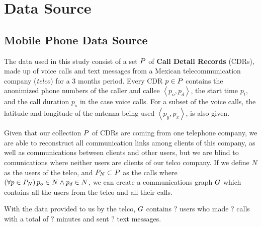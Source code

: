 \section{Data Source}

\subsection{Mobile Phone Data Source}

The data used in this study consist of a set \( \mathlarger{P} \) of \textbf{Call Detail Records} (CDRs), made up of voice calls and text messages from a Mexican telecommunication company (\textit{telco}) for a 3 months period.
Every CDR \( p \in \mathlarger{P} \)  contains the anonimized phone numbers of the caller and callee \( \left< p_o, p_d \right> \), the start time \( p_t \), and the call duration \( p_s \) in the case voice calls. 
For a subset of the voice calls, the latitude and longitude of the antenna being used \( \left< p_y, p_x \right> \), is also given.


Given that our collection \( \mathlarger{P} \) of CDRs are
coming from one telephone company, 
we are able to reconstruct all communication links among clients of this company, as well as communications between clients and other users, but we are blind to comunications where neither users are clients of our telco company.
If we define \( N \) as the users of the telco, and \( \mathlarger{P}_N \subset \mathlarger{P} \) as the calls where \( \left( \forall p \in \mathlarger{P}_N \right) p_o \in N \wedge p_d \in N \), we can create a communications graph \( \mathlarger{G} \) which contains all the users from the telco and all their calls.

With the data provided to us by the telco, \( \mathlarger{G} \) contains \( ? \) users who made \( ? \) calls with a total of \( ? \) minutes and sent \( ? \) text messages.
